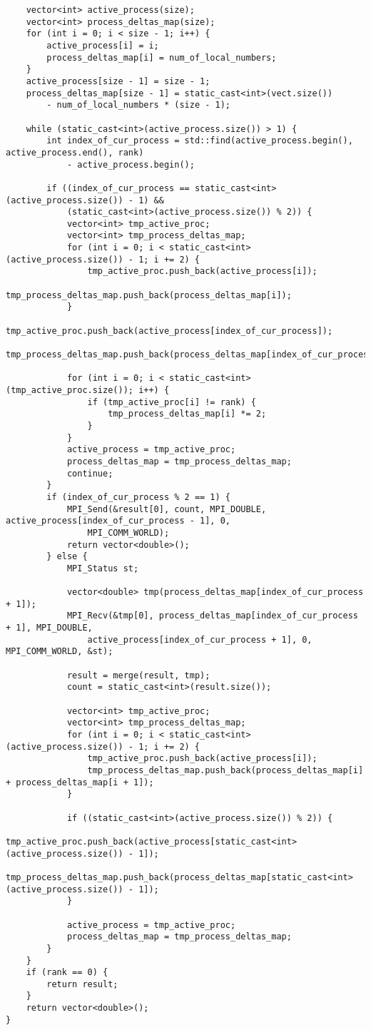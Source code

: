 \documentclass{report}
\begin{document}
\begin{lstlisting}
    vector<int> active_process(size);
    vector<int> process_deltas_map(size);
    for (int i = 0; i < size - 1; i++) {
        active_process[i] = i;
        process_deltas_map[i] = num_of_local_numbers;
    }
    active_process[size - 1] = size - 1;
    process_deltas_map[size - 1] = static_cast<int>(vect.size())
        - num_of_local_numbers * (size - 1);

    while (static_cast<int>(active_process.size()) > 1) {
        int index_of_cur_process = std::find(active_process.begin(), active_process.end(), rank)
            - active_process.begin();

        if ((index_of_cur_process == static_cast<int>(active_process.size()) - 1) &&
            (static_cast<int>(active_process.size()) % 2)) {
            vector<int> tmp_active_proc;
            vector<int> tmp_process_deltas_map;
            for (int i = 0; i < static_cast<int>(active_process.size()) - 1; i += 2) {
                tmp_active_proc.push_back(active_process[i]);
                tmp_process_deltas_map.push_back(process_deltas_map[i]);
            }
            tmp_active_proc.push_back(active_process[index_of_cur_process]);
            tmp_process_deltas_map.push_back(process_deltas_map[index_of_cur_process]);

            for (int i = 0; i < static_cast<int>(tmp_active_proc.size()); i++) {
                if (tmp_active_proc[i] != rank) {
                    tmp_process_deltas_map[i] *= 2;
                }
            }
            active_process = tmp_active_proc;
            process_deltas_map = tmp_process_deltas_map;
            continue;
        }
        if (index_of_cur_process % 2 == 1) {
            MPI_Send(&result[0], count, MPI_DOUBLE, active_process[index_of_cur_process - 1], 0,
                MPI_COMM_WORLD);
            return vector<double>();
        } else {
            MPI_Status st;

            vector<double> tmp(process_deltas_map[index_of_cur_process + 1]);
            MPI_Recv(&tmp[0], process_deltas_map[index_of_cur_process + 1], MPI_DOUBLE,
                active_process[index_of_cur_process + 1], 0, MPI_COMM_WORLD, &st);

            result = merge(result, tmp);
            count = static_cast<int>(result.size());

            vector<int> tmp_active_proc;
            vector<int> tmp_process_deltas_map;
            for (int i = 0; i < static_cast<int>(active_process.size()) - 1; i += 2) {
                tmp_active_proc.push_back(active_process[i]);
                tmp_process_deltas_map.push_back(process_deltas_map[i] + process_deltas_map[i + 1]);
            }

            if ((static_cast<int>(active_process.size()) % 2)) {
                tmp_active_proc.push_back(active_process[static_cast<int>(active_process.size()) - 1]);
                tmp_process_deltas_map.push_back(process_deltas_map[static_cast<int>(active_process.size()) - 1]);
            }

            active_process = tmp_active_proc;
            process_deltas_map = tmp_process_deltas_map;
        }
    }
    if (rank == 0) {
        return result;
    }
    return vector<double>();
}
\end{lstlisting}
    
\end{document}
